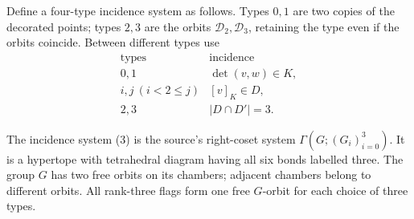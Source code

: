 Define a four-type incidence system as follows. Types $0,1$ are
two copies of the decorated points; types $2,3$ are the orbits
$\mathcal D_2,\mathcal D_3$, retaining the type even if the orbits
coincide. Between different types use
\[
\begin{array}{c|l}
\text{types}&\text{incidence}\\\hline
0,1&\det(v,w)\in K,\\
i,j\ (i<2\le j)&[v]_K\in D,\\
2,3&|D\cap D'|=3.
\end{array}                                                     \tag{3}
\]

\begin{theorem}\label{full-geometry}
The incidence system (3) is the source's right-coset system
$\Gamma(G;(G_i)_{i=0}^3)$. It is a hypertope with tetrahedral
diagram having all six bonds labelled three. The group $G$ has
two free orbits on its chambers; adjacent chambers belong to
different orbits. All rank-three flags form one free $G$-orbit
for each choice of three types.
\end{theorem}
